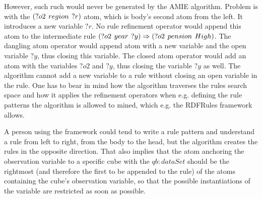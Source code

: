 However, such ruch would never be generated by the AMIE algorithm. Problem is with the $(?o2\hspace{0.4em}region\hspace{0.4em}?r)$ atom, which is body's second atom from the left. It introduces a new variable $?r$. No rule refinement operator would append this atom to the intermediate rule $(?o2\hspace{0.4em}year\hspace{0.4em}?y) \Rightarrow (?o2\hspace{0.4em}pension\hspace{0.4em}High)$. The dangling atom operator would append atom with a new variable and the open variable $?y$, thus closing this variable. The closed atom operator would add an atom with the variables $?o2$ and $?y$, thus closing the variable $?y$ as well. The algorithm cannot add a new variable to a rule without closing an open variable in the rule. One has to bear in mind how the algorithm traverses the rules search space and how it applies the refinement operators when e.g. defining the rule patterns the algorithm is allowed to mined, which e.g. the RDFRules framework allows. 

A person using the framework could tend to write a rule pattern and understand a rule from left to right, from the body to the head, but the algorithm creates the rules in the opposite direction. That also implies that the atom anchoring the observation variable to a specific cube with the $qb:dataSet$ should be the rightmost (and therefore the first to be appended to the rule) of the atoms containing the cube's observation variable, so that the possible instantiations of the variable are restricted as soon as possible.